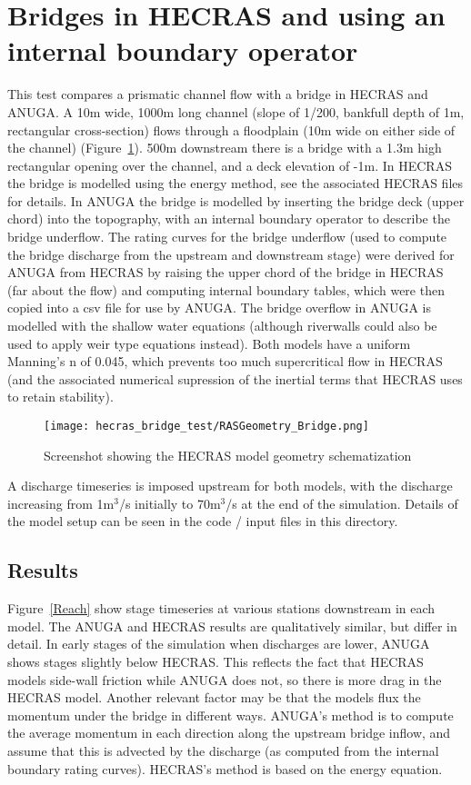 \section{Bridges in HECRAS and \anuga{} using an internal boundary operator}
This test compares a prismatic channel flow with a bridge in HECRAS and ANUGA.
A 10m wide, 1000m long channel (slope of 1/200, bankfull depth of 1m,
rectangular cross-section) flows through a floodplain (10m wide on either side
of the channel) (Figure~\ref{schematic}). 500m downstream there is a bridge
with a 1.3m high rectangular opening over the channel, and a deck elevation of
-1m. In HECRAS the bridge is modelled using the energy method, see the
associated HECRAS files for details. In ANUGA the bridge is modelled by
inserting the bridge deck (upper chord) into the topography, with an internal
boundary operator to describe the bridge underflow. The rating curves for the
bridge underflow (used to compute the bridge discharge from the upstream and
downstream stage) were derived for ANUGA from HECRAS by raising the upper chord
of the bridge in HECRAS (far about the flow) and computing internal boundary
tables, which were then copied into a csv file for use by ANUGA. The bridge
overflow in ANUGA is modelled with the shallow water equations (although
riverwalls could also be used to apply weir type equations instead). Both
models have a uniform Manning's n of 0.045, which prevents too much
supercritical flow in HECRAS (and the associated numerical supression of the
inertial terms that HECRAS uses to retain stability).

\begin{figure}
\begin{center}
\texttt{[image: hecras\_bridge\_test/RASGeometry\_Bridge.png]}
\end{center}
\caption{Screenshot showing the HECRAS model geometry schematization}
\label{schematic}
\end{figure}


A discharge timeseries is imposed upstream for both models, with the discharge
increasing from 1m$^3$/s initially to 70m$^3$/s at the end of the simulation.
Details of the model setup can be seen in the code / input files in this
directory.

\subsection{Results}

Figure~\ref{Reach} show stage timeseries at various stations downstream in each
model. The ANUGA and HECRAS results are qualitatively similar, but differ in
detail. In early stages of the simulation when discharges are lower, ANUGA
shows stages slightly below HECRAS. This reflects the fact that HECRAS models
side-wall friction while ANUGA does not, so there is more drag in the HECRAS
model. Another relevant factor may be that the models flux the momentum under
the bridge in different ways. ANUGA's method is to compute the average momentum
in each direction along the upstream bridge inflow, and assume that this is
advected by the discharge (as computed from the internal boundary rating
curves). HECRAS's method is based on the energy equation.

